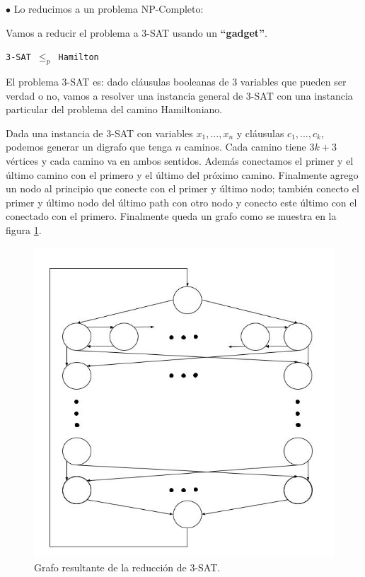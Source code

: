 \documentclass[a4paper,10pt]{article}
\begin{document}
	$\bullet$ Lo reducimos a un problema NP-Completo:

	Vamos a reducir el problema a 3-SAT usando un \textbf{``gadget''}.

	\texttt{3-SAT $\leq_p$ Hamilton}
	\linebreak

	El problema 3-SAT es: dado cláusulas booleanas de 3 variables que pueden ser verdad o no, vamos a resolver una instancia general de 3-SAT con una instancia particular del problema del camino Hamiltoniano.

	Dada una instancia de 3-SAT con variables $x_1, ..., x_n$ y cláusulas $c_1, ..., c_k$, podemos generar un digrafo que tenga $n$ caminos. Cada camino tiene $3k+3$ vértices y cada camino va en ambos sentidos. Además conectamos el primer y el último camino con el primero y el último del próximo camino. Finalmente agrego un nodo al principio que conecte con el primer y último nodo; también conecto el primer y último nodo del último path con otro nodo y conecto este último con el conectado con el primero. Finalmente queda un grafo como se muestra en la figura \ref{fig:punto-3-1}.

	\begin{figure}[!htb]
		\centering
		\includegraphics[scale=0.35]{images/grafo-3-1.jpg}
		\caption{Grafo resultante de la reducción de 3-SAT.}
		\label{fig:punto-3-1}
	\end{figure}
\end{document}
